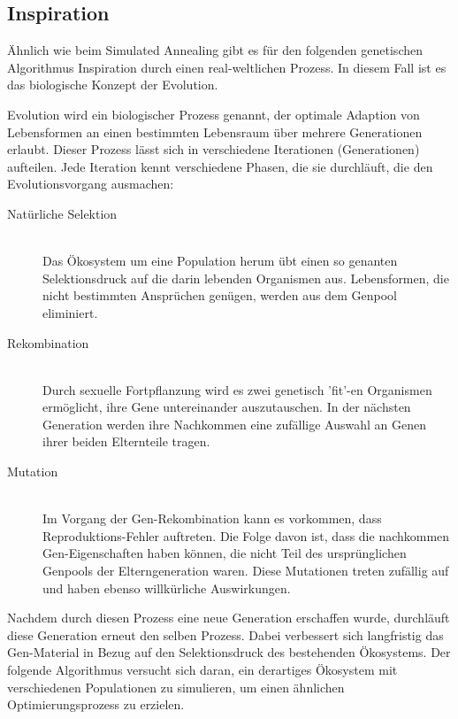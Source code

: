 \documentclass[runningheads,a4paper]{llncs}
\begin{document}
\subsection{Inspiration}

Ähnlich wie beim Simulated Annealing gibt es für den folgenden genetischen Algorithmus Inspiration durch einen real-weltlichen Prozess. In diesem Fall ist es das biologische Konzept der Evolution.

Evolution wird ein biologischer Prozess genannt, der optimale Adaption von Lebensformen an einen bestimmten Lebensraum über mehrere Generationen erlaubt. Dieser Prozess lässt sich in verschiedene Iterationen (Generationen) aufteilen. Jede Iteration kennt verschiedene Phasen, die sie durchläuft, die den Evolutionsvorgang ausmachen:

\begin{description}
	\item[Natürliche Selektion] \hfill \\ Das Ökosystem um eine Population herum übt einen so genanten Selektionsdruck auf die darin lebenden Organismen aus. Lebensformen, die nicht bestimmten Ansprüchen genügen, werden aus dem Genpool eliminiert.

	\item[Rekombination] \hfill \\ Durch sexuelle Fortpflanzung wird es zwei genetisch 'fit'-en Organismen ermöglicht, ihre Gene untereinander auszutauschen. In der nächsten Generation werden ihre Nachkommen eine zufällige Auswahl an Genen ihrer beiden Elternteile tragen.

	\item[Mutation] \hfill \\ Im Vorgang der Gen-Rekombination kann es vorkommen, dass Reproduktions-Fehler auftreten. Die Folge davon ist, dass die nachkommen Gen-Eigenschaften haben können, die nicht Teil des ursprünglichen Genpools der Elterngeneration waren. Diese Mutationen treten zufällig auf und haben ebenso willkürliche Auswirkungen.
\end{description}

Nachdem durch diesen Prozess eine neue Generation erschaffen wurde, durchläuft diese Generation erneut den selben Prozess. Dabei verbessert sich langfristig das Gen-Material in Bezug auf den Selektionsdruck des bestehenden Ökosystems. Der folgende Algorithmus versucht sich daran,  ein derartiges Ökosystem mit verschiedenen Populationen zu simulieren, um einen ähnlichen Optimierungsprozess zu erzielen.
\end{document}
